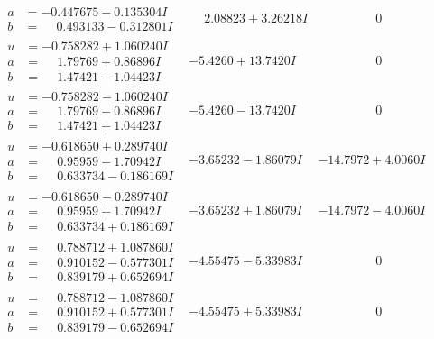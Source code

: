 \documentclass[1p]{elsarticle_modified}
\theoremstyle{definition}
\begin{document}
$$\begin{array}{c|c|c}
\begin{aligned}
a &= -0.447675 - 0.135304 I \\
b &= \phantom{-}0.493133 - 0.312801 I\end{aligned}
 & \phantom{-}2.08823 + 3.26218 I & \phantom{-0.000000 } 0 \\ \hline\begin{aligned}
u &= -0.758282 + 1.060240 I \\
a &= \phantom{-}1.79769 + 0.86896 I \\
b &= \phantom{-}1.47421 - 1.04423 I\end{aligned}
 & -5.4260 + 13.7420 I & \phantom{-0.000000 } 0 \\ \hline\begin{aligned}
u &= -0.758282 - 1.060240 I \\
a &= \phantom{-}1.79769 - 0.86896 I \\
b &= \phantom{-}1.47421 + 1.04423 I\end{aligned}
 & -5.4260 - 13.7420 I & \phantom{-0.000000 } 0 \\ \hline\begin{aligned}
u &= -0.618650 + 0.289740 I \\
a &= \phantom{-}0.95959 - 1.70942 I \\
b &= \phantom{-}0.633734 - 0.186169 I\end{aligned}
 & -3.65232 - 1.86079 I & -14.7972 + 4.0060 I \\ \hline\begin{aligned}
u &= -0.618650 - 0.289740 I \\
a &= \phantom{-}0.95959 + 1.70942 I \\
b &= \phantom{-}0.633734 + 0.186169 I\end{aligned}
 & -3.65232 + 1.86079 I & -14.7972 - 4.0060 I \\ \hline\begin{aligned}
u &= \phantom{-}0.788712 + 1.087860 I \\
a &= \phantom{-}0.910152 - 0.577301 I \\
b &= \phantom{-}0.839179 + 0.652694 I\end{aligned}
 & -4.55475 - 5.33983 I & \phantom{-0.000000 } 0 \\ \hline\begin{aligned}
u &= \phantom{-}0.788712 - 1.087860 I \\
a &= \phantom{-}0.910152 + 0.577301 I \\
b &= \phantom{-}0.839179 - 0.652694 I\end{aligned}
 & -4.55475 + 5.33983 I & \phantom{-0.000000 } 0\\

\end{array}$$
\end{document}
